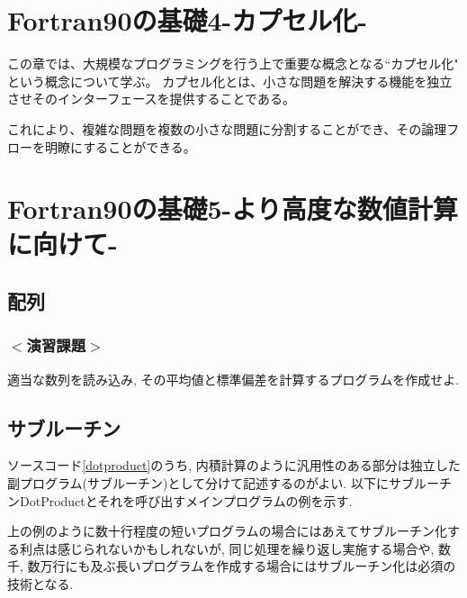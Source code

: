 \documentclass[a4j]{jsbook}
\begin{document}



\chapter{Fortran90の基礎4-カプセル化-}
この章では、大規模なプログラミングを行う上で重要な概念となる``カプセル化" という概念について学ぶ。
カプセル化とは、小さな問題を解決する機能を独立させそのインターフェースを提供することである。

これにより、複雑な問題を複数の小さな問題に分割することができ、その論理フローを明瞭にすることができる。



\chapter{Fortran90の基礎5-より高度な数値計算に向けて-}
\section{配列}




\subsection*{$<$演習課題$>$}
適当な数列を読み込み, その平均値と標準偏差を計算するプログラムを作成せよ.

\section{サブルーチン}
ソースコード\ref{dotproduct}のうち,
内積計算のように汎用性のある部分は独立した副プログラム(サブルーチン)として分けて記述するのがよい.
以下にサブルーチンDotProductとそれを呼び出すメインプログラムの例を示す.

上の例のように数十行程度の短いプログラムの場合にはあえてサブルーチン化する利点は感じられないかもしれないが,
同じ処理を繰り返し実施する場合や,
数千, 数万行にも及ぶ長いプログラムを作成する場合にはサブルーチン化は必須の技術となる.
\end{document}
